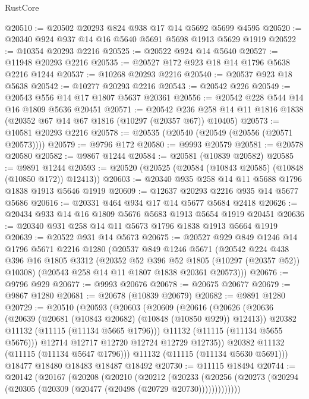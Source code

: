 \begin{lexlean}{RustCore}
\begin{coremodule}
@20510 := @20502 @20293 @824 @938 @17 @14 @5692 @5699 @4595
@20520 := @20340 @924 @937 @14 @16 @5640 @5691 @5698 @1913 @5629 @1919
@20522 := @10354 @20293 @2216
@20525 := @20522 @924 @14 @5640
@20527 := @11948 @20293 @2216
@20535 := @20527 @172 @923 @18 @14 @1796 @5638 @2216 @1244
@20537 := @10268 @20293 @2216
@20540 := @20537 @923 @18 @5638
@20542 := @10277 @20293 @2216
@20543 := @20542 @226
@20549 := @20543 @556 @14 @17 @1807 @5637 @20361
@20556 := @20542 @228 @544 @14 @16 @1809 @5636 @20451
@20571 := @20542
    @236
    @258
    @14
    @11
    @1816
    @1838
    (@20352 @67 @14 @67 @1816 (@10297 (@20357 @67)) @10405)
@20573 := @10581 @20293 @2216
@20578 := @20535 (@20540 (@20549 (@20556 (@20571 @20573))))
@20579 := @9796 @172
@20580 := @9993 @20579
@20581 := @20578 @20580
@20582 := @9867 @1244
@20584 := @20581 (@10839 @20582)
@20585 := @9891 @1244
@20593 := @20520 (@20525 (@20584 (@10843 @20585) (@10848 (@10850 @172)) @12413))
@20603 := @20340 @935 @258 @14 @11 @5688 @1796 @1838 @1913 @5646 @1919
@20609 := @12637 @20293 @2216 @935 @14 @5677 @5686
@20616 := @20331 @464 @934 @17 @14 @5677 @5684 @2418
@20626 := @20434 @933 @14 @16 @1809 @5676 @5683 @1913 @5654 @1919 @20451
@20636 := @20340 @931 @258 @14 @11 @5673 @1796 @1838 @1913 @5664 @1919
@20639 := @20522 @931 @14 @5673
@20675 := @20527
    @929
    @849
    @1246
    @14
    @1796
    @5671
    @2216
    @1280
    (@20537
      @849
      @1246
      @5671
      (@20542
        @224
        @438
        @396
        @16
        @1805
        @3312
        (@20352 @52 @396 @52 @1805 (@10297 (@20357 @52)) @10308)
        (@20543 @258 @14 @11 @1807 @1838 @20361 @20573)))
@20676 := @9796 @929
@20677 := @9993 @20676
@20678 := @20675 @20677
@20679 := @9867 @1280
@20681 := @20678 (@10839 @20679)
@20682 := @9891 @1280
@20729 := @20510
    (@20593
      (@20603
        (@20609
          (@20616
            (@20626
              (@20636
                (@20639 (@20681 (@10843 @20682) (@10848 (@10850 @929)) @12413))
                @20382
                @11132
                (@11115 (@11134 @5665 @1796)))
              @11132
              (@11115 (@11134 @5655 @5676)))
            @12714
            @12717
            @12720
            @12724
            @12729
            @12735))
        @20382
        @11132
        (@11115 (@11134 @5647 @1796)))
      @11132
      (@11115 (@11134 @5630 @5691)))
    @18477
    @18480
    @18483
    @18487
    @18492
@20730 := @11115 @18494
@20744 := @20142
    (@20167
      (@20208
        (@20210
          (@20212
            (@20233
              (@20256 (@20273 (@20294 (@20305 (@20309 (@20477 (@20498 (@20729 @20730)))))))))))))

\end{coremodule}
\end{lexlean}
